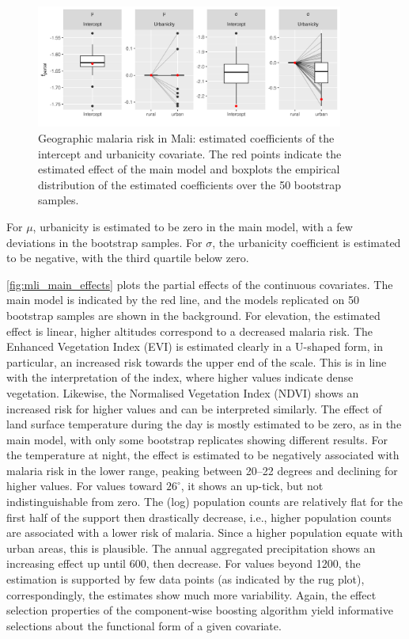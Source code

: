 \begin{figure}[!t]
	\centering
	\includegraphics[width=0.9\textwidth, keepaspectratio]{figures/mali_categoricaleffects.png}
	\caption{Geographic malaria risk in Mali: estimated coefficients of the intercept and urbanicity covariate. The red points indicate the estimated effect of the main model and boxplots the empirical distribution of the estimated coefficients over the 50 bootstrap samples.}
	\label{fig:mali_categoricaleffects}
\end{figure}

For $\mu$, urbanicity is estimated to be zero in the main model, with a few deviations in the bootstrap samples. For $\sigma$, the urbanicity coefficient is estimated to be negative, with the third quartile below zero. 

\autoref{fig:mli_main_effects} plots the partial effects of the continuous covariates. The main model is indicated by the red line, and the models replicated on 50 bootstrap samples are shown in the background. For elevation, the estimated effect is linear, higher altitudes correspond to a decreased malaria risk. The Enhanced Vegetation Index (EVI) is estimated clearly in a U-shaped form, in particular, an increased risk towards the upper end of the scale. This is in line with the interpretation of the index, where higher values indicate dense vegetation. Likewise, the Normalised Vegetation Index (NDVI) shows an increased risk for higher values and can be interpreted similarly. The effect of land surface temperature during the day is mostly estimated to be zero, as in the main model, with only some bootstrap replicates showing different results. For the temperature at night, the effect is estimated to be negatively associated with malaria risk in the lower range, peaking between 20--22 degrees and declining for higher values. For values toward $26^\circ$, it shows an up-tick, but not indistinguishable from zero. The (log) population counts are relatively flat for the first half of the support then drastically decrease, i.e., higher population counts are associated with a lower risk of malaria. Since a higher population equate with urban areas, this is plausible. The annual aggregated precipitation shows an increasing effect up until 600, then decrease. For values beyond 1200, the estimation is supported by few data points (as indicated by the rug plot), correspondingly, the estimates show much more variability. Again, the effect selection properties of the component-wise boosting algorithm yield informative selections about the functional form of a given covariate.

